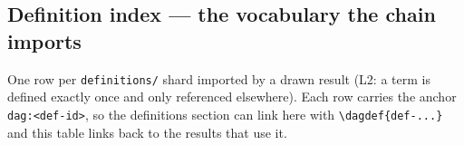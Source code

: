 
\subsection*{Definition index --- the vocabulary the chain imports}
\label{tab:dag-defs}
\noindent One row per \texttt{definitions/} shard imported by a drawn result (L2: a term is defined exactly once and only referenced elsewhere). Each row carries the anchor \texttt{dag:\textless def-id\textgreater}, so the definitions section can link here with \texttt{\textbackslash dagdef\{def-...\}} and this table links back to the results that use it.
\begingroup\scriptsize
